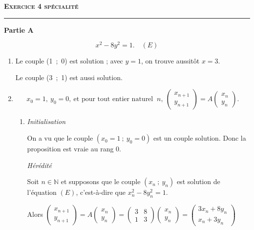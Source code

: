 \documentclass[10pt]{article}
\newcommand{\N}{\mathbb{N}}
\begin{document}
\bigskip

\textbf{\textsc{Exercice 4  spécialité}} \smallskip  \hrule \medskip 

\bigskip

\textbf{Partie A}



\[x^2 - 8y^2 = 1. \quad(E)\]

\medskip

\begin{enumerate}
\item %
Le couple (1~;~0) est solution ; avec $y = 1$, on trouve aussitôt $x = 3$.

Le couple (3~;~1) est aussi solution.
\item %


\[x_0 = 1,\: y_0 = 0,\: \text{et pour tout entier naturel }\:n,\: \begin{pmatrix}x_{n+1}\\y_{n+1}\end{pmatrix} = A\begin{pmatrix}x_{n}\\y_{n}\end{pmatrix}.\]
	\begin{enumerate}
		\item %

\emph{Initialisation}

On a vu  que le couple $\left(x_0 = 1~;~y_0 = 0 \right)$ est un couple solution. Donc la proposition est vraie au rang $0$.

\emph{Hérédité}

Soit $n \in \N$ et supposons que le couple $\left(x_n~;~y_n\right)$ est solution de l'équation $(E)$, c'est-à-dire que $x_n^2 - 8y_n^2 = 1$.

Alors $\begin{pmatrix}x_{n+1}\\y_{n+1}\end{pmatrix} = A\begin{pmatrix}x_{n}\\y_{n}\end{pmatrix} =  \begin{pmatrix}3&8\\1&3\end{pmatrix}\begin{pmatrix}x_{n}\\y_{n}\end{pmatrix} = \begin{pmatrix}3x_{n} + 8y_n\\x_n + 3y_{n}\end{pmatrix}$


\end{enumerate}
\end{enumerate}
\end{document}

